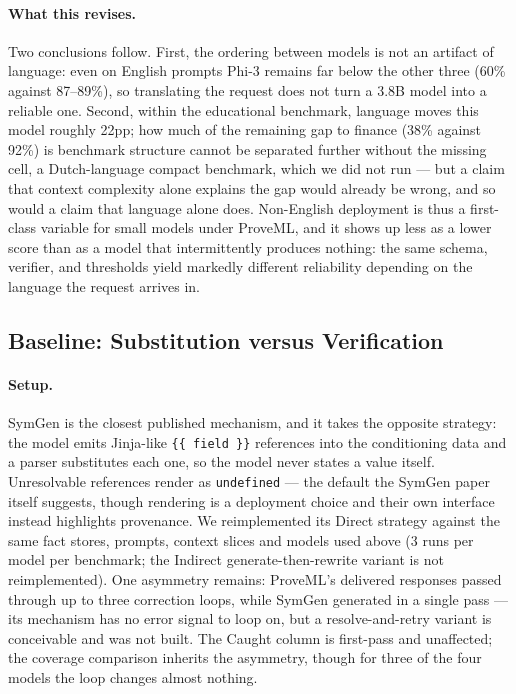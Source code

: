 \documentclass[11pt,a4paper]{article}
\begin{document}
\paragraph{What this revises.} Two conclusions follow. First, the ordering between models is not an artifact of language: even on English prompts Phi-3 remains far below the other three (60\% against 87--89\%), so translating the request does not turn a 3.8B model into a reliable one. Second, within the educational benchmark, language moves this model roughly 22pp; how much of the remaining gap to finance (38\% against 92\%) is benchmark structure cannot be separated further without the missing cell, a Dutch-language compact benchmark, which we did not run --- but a claim that context complexity alone explains the gap would already be wrong, and so would a claim that language alone does. Non-English deployment is thus a first-class variable for small models under ProveML, and it shows up less as a lower score than as a model that intermittently produces nothing: the same schema, verifier, and thresholds yield markedly different reliability depending on the language the request arrives in.

\subsection{Baseline: Substitution versus Verification}
\label{sec:symgen}

\paragraph{Setup.} SymGen \citep{symgen} is the closest published mechanism, and it takes the opposite strategy: the model emits Jinja-like \texttt{\{\{ field \}\}} references into the conditioning data and a parser substitutes each one, so the model never states a value itself. Unresolvable references render as \texttt{undefined} --- the default the SymGen paper itself suggests, though rendering is a deployment choice and their own interface instead highlights provenance. We reimplemented its Direct strategy against the same fact stores, prompts, context slices and models used above (3 runs per model per benchmark; the Indirect generate-then-rewrite variant is not reimplemented). One asymmetry remains: ProveML's delivered responses passed through up to three correction loops, while SymGen generated in a single pass --- its mechanism has no error signal to loop on, but a resolve-and-retry variant is conceivable and was not built. The Caught column is first-pass and unaffected; the coverage comparison inherits the asymmetry, though for three of the four models the loop changes almost nothing.
\end{document}
